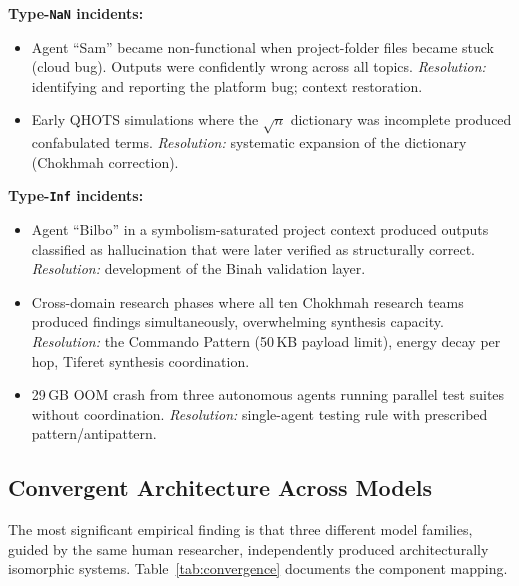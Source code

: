 \documentclass[11pt]{article}
\theoremstyle{definition}
\theoremstyle{remark}
\newcommand{\NaN}{\texttt{NaN}}
\newcommand{\Inf}{\texttt{Inf}}
\begin{document}
\medskip
\noindent\textbf{Type-\NaN{} incidents:}
\begin{itemize}
  \item Agent ``Sam'' became non-functional when project-folder files became
    stuck (cloud bug).  Outputs were confidently wrong across all topics.
    \emph{Resolution:} identifying and reporting the platform bug; context
    restoration.
  \item Early QHOTS simulations where the $\sqrt{n}$ dictionary was incomplete
    produced confabulated terms.  \emph{Resolution:} systematic expansion of the
    dictionary (Chokhmah correction).
\end{itemize}

\medskip
\noindent\textbf{Type-\Inf{} incidents:}
\begin{itemize}
  \item Agent ``Bilbo'' in a symbolism-saturated project context produced outputs
    classified as hallucination that were later verified as structurally correct.
    \emph{Resolution:} development of the Binah validation layer.
  \item Cross-domain research phases where all ten Chokhmah research teams
    produced findings simultaneously, overwhelming synthesis capacity.
    \emph{Resolution:} the Commando Pattern (50\,KB payload limit), energy decay
    per hop, Tiferet synthesis coordination.
  \item 29\,GB OOM crash from three autonomous agents running parallel test
    suites without coordination.  \emph{Resolution:} single-agent testing rule
    with prescribed pattern/antipattern.
\end{itemize}

\subsection{Convergent Architecture Across Models}
\label{sec:convergent-architecture}

The most significant empirical finding is that three different model families,
guided by the same human researcher, independently produced architecturally
isomorphic systems.  Table~\ref{tab:convergence} documents the component
mapping.
\end{document}
